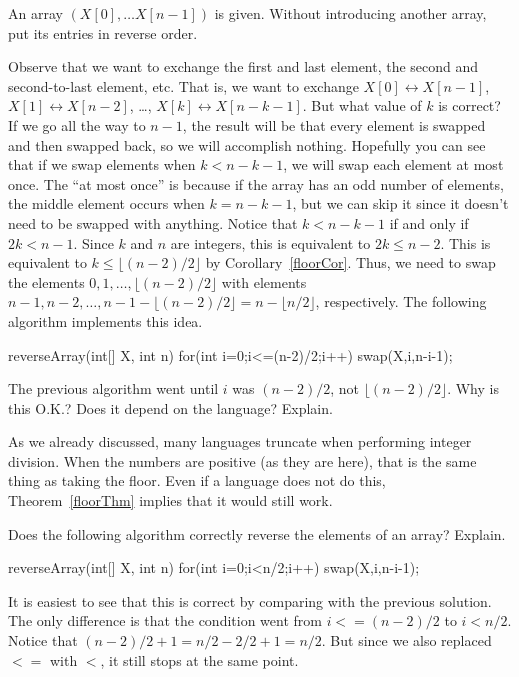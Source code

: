 \begin{exa}
An array $(X[0], \ldots X[n - 1])$ is given. 
Without introducing another array, put its entries in reverse order.
\label{exa:ReverseArray}
\begin{sol} 
Observe that we want to exchange the first and last element, the second and second-to-last element, etc.
That is, we want to exchange $X[0] \leftrightarrow X[n - 1]$, $X[1] \leftrightarrow X[n - 2]$, \ldots,
$X[k] \leftrightarrow X[n - k - 1]$.  But what value of $k$ is correct?  If we go all the way to $n-1$,
the result will be that every element is swapped and then swapped back, so we will accomplish nothing.
Hopefully you can see that if we swap elements when $k<n-k-1$, we will swap each element at most once.  
The ``at most once'' is because if the array has an odd number of elements, 
the middle element occurs when $k=n-k-1$, but we can skip it since it doesn't need to be swapped with anything.
Notice that $k<n-k-1$ if and only if $2k<n-1$. 
Since $k$ and $n$ are integers, this is equivalent to $2k\leq n-2$.
This is equivalent to $k\leq \lfloor (n-2)/2\rfloor$ by Corollary~\ref{floorCor}.
Thus, we need to swap the elements $0,1,\ldots, \lfloor (n-2)/2\rfloor$
with elements $n-1, n-2, \ldots, n-1-\lfloor (n-2)/2\rfloor=n-\lfloor n/2\rfloor$, respectively.
The following algorithm implements this idea.
\begin{code}
    reverseArray(int[] X, int n) {
        for(int i=0;i<=(n-2)/2;i++) {
            swap(X,i,n-i-1);
        }
    }
\end{code}
\end{sol}
\end{exa} 

\begin{ques}
The previous algorithm went until $i$ was $(n-2)/2$, not $\lfloor (n-2)/2\rfloor$.
Why is this O.K.?  Does it depend on the language?  Explain.\\
\answerlinetwo
\begin{answer}
As we already discussed, many languages truncate when performing integer division.
When the numbers are positive (as they are here), that is the same thing as taking the floor.
Even if a language does not do this, Theorem~\ref{floorThm} implies that it would still work.
\end{answer}
\end{ques}

\begin{ques}
Does the following algorithm correctly reverse the elements of an array? Explain.
\begin{code}
reverseArray(int[] X, int n) {
    for(int i=0;i<n/2;i++) {
        swap(X,i,n-i-1);
    }
}
\end{code}
\answerlinetwo
\begin{answer}
It is easiest to see that this is correct by comparing with the previous solution.
The only difference is that the condition went from $i<=(n-2)/2$ to $i<n/2$.
Notice that $(n-2)/2+1=n/2-2/2+1=n/2$.  
But since we also replaced $<=$ with $<$, it still stops at the same point.
\end{answer}
\end{ques}

